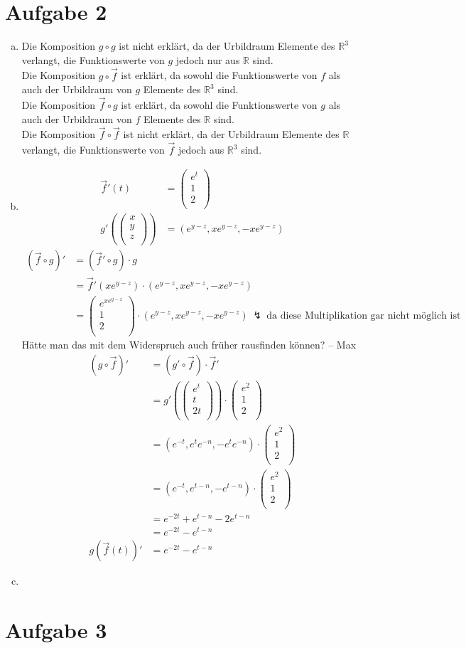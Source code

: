 \documentclass[10pt,a4paper,parskip=half]{scrartcl}
\newcommand{\R}{\mathbb{R}}
\newcommand{\vecthree}[3]{\left(\begin {array} {c}#1\\#2\\#3\\\end {array} \right) }
\begin{document}
\section*{Aufgabe 2}
\begin{enumerate}[(a)]
\item
Die Komposition $g \circ g$ ist nicht erklärt, da der Urbildraum Elemente des $\mathbb{\R}^3$ verlangt, die Funktionswerte von $g$ jedoch nur aus $\mathbb{\R}$ sind.\\
Die Komposition $g \circ \vec f$ ist erklärt, da sowohl die Funktionswerte von $f$ als auch der Urbildraum von $g$ Elemente des $\mathbb{\R}^3$ sind.\\
Die Komposition $\vec f \circ g$ ist erklärt, da sowohl die Funktionswerte von $g$ als auch der Urbildraum von $f$ Elemente des $\mathbb{\R}$ sind.\\
Die Komposition $\vec f \circ \vec f$ ist nicht erklärt, da der Urbildraum Elemente des $\mathbb{\R}$ verlangt, die Funktionswerte von $\vec f$ jedoch aus $\mathbb{\R}^3$ sind.\item
\begin{align*}
\vec f'(t) &= \vecthree{e^t}{1}{2} \\
g'(\vecthree{x}{y}{z}) &= \left(e^{y-z}, xe^{y-z}, -xe^{y-z}\right)
\end{align*}
\begin{align*} 
(\vec f \circ g)' &= (\vec f' \circ g) \cdot g \\
&= \vec f'(xe^{y-z}) \cdot \left(e^{y-z}, xe^{y-z}, -xe^{y-z}\right) \\
&= \vecthree{e^{xe^{y-z}}}{1}{2} \cdot \left(e^{y-z}, xe^{y-z}, -xe^{y-z}\right) \ \lightning\ \text{da diese Multiplikation gar nicht möglich ist}
\end{align*}
Hätte man das mit dem Widerspruch auch früher rausfinden können? -- Max
\begin{align*} 
(g \circ \vec f)' &= (g' \circ \vec f) \cdot \vec f' \\
&= g'(\vecthree{e^t}{t}{2t}) \cdot \vecthree{e^2}{1}{2} \\
&= \left(e^{-t}, e^te^{-n}, -e^te^{-n}\right) \cdot \vecthree{e^2}{1}{2} \\
&= \left(e^{-t}, e^{t-n}, -e^{t-n}\right) \cdot \vecthree{e^2}{1}{2} \\
&= e^{-2t} + e^{t-n} - 2e^{t-n}\\
&= e^{-2t} - e^{t-n}\\
g(\vec f(t))' &= e^{-2t} - e^{t-n}
\end{align*}
\item
\end{enumerate}
\section*{Aufgabe 3}
\end{document}
